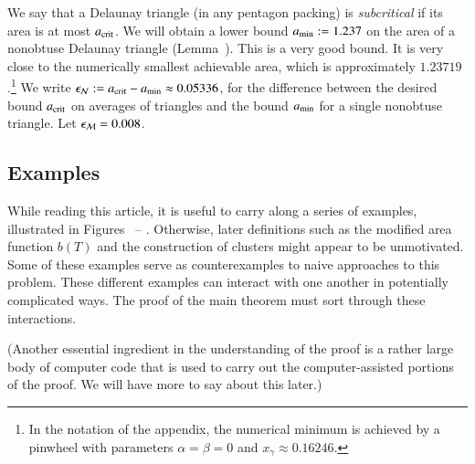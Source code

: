 We say that a Delaunay triangle (in any pentagon packing) is {\it
  subcritical} if its area is at most $a_\text{crit}$.  We will obtain a
lower bound $a_\text{min} := 1.237$ on the area of a nonobtuse Delaunay
triangle (Lemma~).  This is a very good bound.  It is
very close to the numerically smallest achievable area, which is
approximately $1.23719$.\footnote{In the notation of the appendix, the
  numerical minimum is achieved by a pinwheel with parameters
  $\alpha=\beta=0$ and $x_\gamma\approx 0.16246$.}  We write $\epsilon_{\mathcal N} :=
a_\text{crit} - a_\text{min} \approx 0.05336$, for the difference between the desired
bound $a_\text{crit}$ on averages of triangles and the bound $a_\text{min}$ for a
single nonobtuse triangle.  Let $\epsilon_{\mathcal M} = 0.008$.

\subsection{Examples}

While reading this article, it is useful to carry along a series of examples,
illustrated in Figures~ -- .
Otherwise, later definitions such as the modified area function $b(T)$
and the construction of clusters might appear to be unmotivated.  Some
of these examples serve as counterexamples to naive approaches to this
problem.  These different examples can interact with one another in
potentially complicated ways.  The proof of the main theorem must sort
through these interactions.

(Another essential ingredient in the understanding of the proof is a
rather large body of computer code that is used to carry out the
computer-assisted portions of the proof.  We will have more to say
about this later.)



